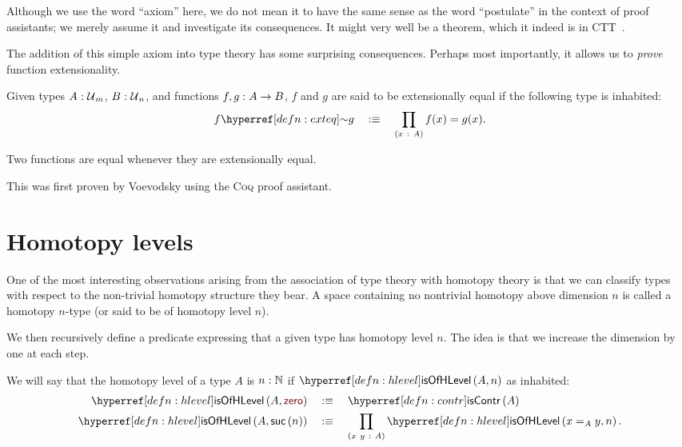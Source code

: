 Although we use the word ``axiom'' here, we do not mean it to have the same sense as the
word ``postulate'' in the context of proof assistants; we merely assume it and investigate
its consequences. It might very well be a theorem, which it indeed is in CTT~\cite{CCHM}.

The addition of this simple axiom into type theory has some surprising consequences.
Perhaps most importantly, it allows us to \emph{prove} function extensionality.
\begin{defn}\label{defn:exteq}
  Given types $A\hspace{0.1mm}:\hspace{0.1mm}\mathcal{U}{}_m$, $B\hspace{0.1mm}:\hspace{0.1mm}\mathcal{U}{}_n$, and functions
  $f, g:A \rightarrow B$, $f$ and $g$ are said to be extensionally equal if the following
  type is inhabited:
  \begin{equation*}
    \exteq{f}{g} \quad\is\quad \pity{x}{A}{f(x) = g(x)}.
  \end{equation*}
\end{defn}

\begin{prop}\label{prop:funext}
  Two functions are equal whenever they are extensionally equal.
\end{prop}

This was first proven by Voevodsky using the \textsc{Coq} proof assistant.

\section{Homotopy levels}

One of the most interesting observations arising from the association of type theory with
homotopy theory is that we can classify types with respect to the non-trivial homotopy
structure they bear. A space containing no nontrivial homotopy above dimension $n$ is
called a homotopy $n$-type (or said to be of homotopy level $n$).

We then recursively define a predicate expressing that a given type has homotopy level
$n$. The idea is that we increase the dimension by one at each step.
\begin{defn}\label{defn:hlevel}
  We will say that the homotopy level of a type $A$ is $n\hspace{0.1mm}:\hspace{0.1mm}\mathbb{N}$ if
  $\isofhlevel{A}{n}$ as inhabited:
  \begin{align*}
    \isofhlevel{A}{\zero{}} &\quad\is\quad \iscontr{A}\\
    \isofhlevel{A}{\suc{n}} &\quad\is\quad \pity{x~y}{A}{\isofhlevel{x =_A y}{n}}.
  \end{align*}
\end{defn}


